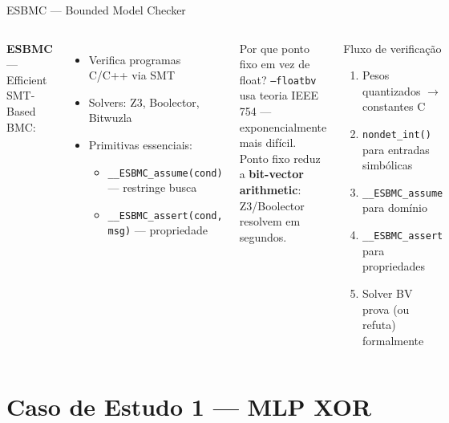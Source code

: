 \documentclass[aspectratio=169]{beamer}
\begin{document}
\begin{frame}{ESBMC --- Bounded Model Checker}
  \begin{columns}
    \textbf{ESBMC} --- Efficient SMT-Based BMC:
    \begin{itemize}
      \item Verifica programas C/C++ via SMT
      \item Solvers: Z3, Boolector, Bitwuzla
      \item Primitivas essenciais:
        \begin{itemize}
          \item \texttt{\_\_ESBMC\_assume(cond)} --- restringe busca
          \item \texttt{\_\_ESBMC\_assert(cond, msg)} --- propriedade
        \end{itemize}
    \end{itemize}
    \vspace{0.5em}
    \begin{block}{Por que ponto fixo em vez de float?}
      \texttt{--floatbv} usa teoria IEEE 754 --- exponencialmente mais difícil.
      Ponto fixo reduz a \textbf{bit-vector arithmetic}: Z3/Boolector
      resolvem em segundos.
    \end{block}

    \begin{exampleblock}{Fluxo de verificação}
      \begin{enumerate}
        \item Pesos quantizados $\to$ constantes C
        \item \texttt{nondet\_int()} para entradas simbólicas
        \item \texttt{\_\_ESBMC\_assume} para domínio
        \item \texttt{\_\_ESBMC\_assert} para propriedades
        \item Solver BV prova (ou refuta) formalmente
      \end{enumerate}
    \end{exampleblock}
  \end{columns}
\end{frame}

\section{Caso de Estudo 1 --- MLP XOR}
\end{document}
